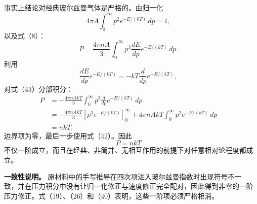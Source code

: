 \documentclass[12pt,a4paper,UTF8]{ctexart}
\begin{document}
事实上结论对经典玻尔兹曼气体是严格的。由归一化 \[
4\pi A\int_0^\infty p^2e^{-E/(kT)}\,dp=1, \tag{42}
\] 以及式（8）： \[
P=\frac{4\pi nA}{3}
\int_0^\infty p^3\frac{dE}{dp}
e^{-E/(kT)}\,dp. \tag{43}
\] 利用 \[
\frac{dE}{dp}e^{-E/(kT)}
=-kT\frac d{dp}e^{-E/(kT)}, \tag{44}
\] 对式（43）分部积分： \[
\begin{aligned}
P
&=-\frac{4\pi nAkT}{3}
\int_0^\infty p^3
\frac d{dp}e^{-E/(kT)}\,dp\\
&=-\frac{4\pi nAkT}{3}
\left[p^3e^{-E/(kT)}\right]_0^\infty
+4\pi nAkT
\int_0^\infty p^2e^{-E/(kT)}\,dp\\
&=nkT.
\end{aligned} \tag{45}
\] 边界项为零，最后一步使用式（42）。因此 \[
\boxed{P=nkT}
\]
不仅一阶成立，而且在经典、非简并、无相互作用的前提下对任意相对论程度都成立。

\textbf{一致性说明。}
原材料中的手写推导在四次项进入玻尔兹曼指数时出现符号不一致，并在压力积分中没有让归一化修正与速度修正完全配对，因此得到非零的一阶压力修正。式（19）、（26）和（40）表明，这些一阶项必须严格相消。
\end{document}
